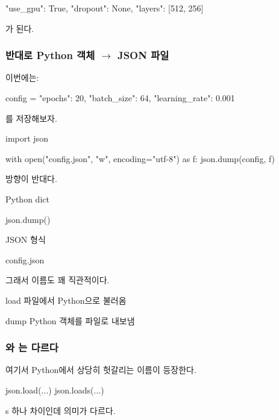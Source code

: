 \begin{dhkzsh}
{
    "use_gpu": True,
    "dropout": None,
    "layers": [512, 256]
}
\end{dhkzsh}

가 된다.

\subsubsection{반대로 Python 객체 $\rightarrow$ JSON 파일}

이번에는:

\begin{dhkzsh}
config = {
    "epochs": 20,
    "batch_size": 64,
    "learning_rate": 0.001
}
\end{dhkzsh}

를 저장해보자.

\begin{dhkcode}
import json

with open("config.json", "w", encoding="utf-8") as f:
    json.dump(config, f)
\end{dhkcode}

방향이 반대다.

\begin{dhksmry}[centered]
Python dict

\da

json.dump()

\da

JSON 형식

\da

config.json
\end{dhksmry}

그래서 이름도 꽤 직관적이다.

\begin{dhksmry}
    load
    파일에서 Python으로 불러옴

    dump
    Python 객체를 파일로 내보냄
\end{dhksmry}

\subsubsection{와 는 다르다}

여기서 Python에서 상당히 헛갈리는 이름이 등장한다.

\begin{dhkcode}
json.load(...)
json.loads(...)
\end{dhkcode}

s 하나 차이인데 의미가 다르다.

